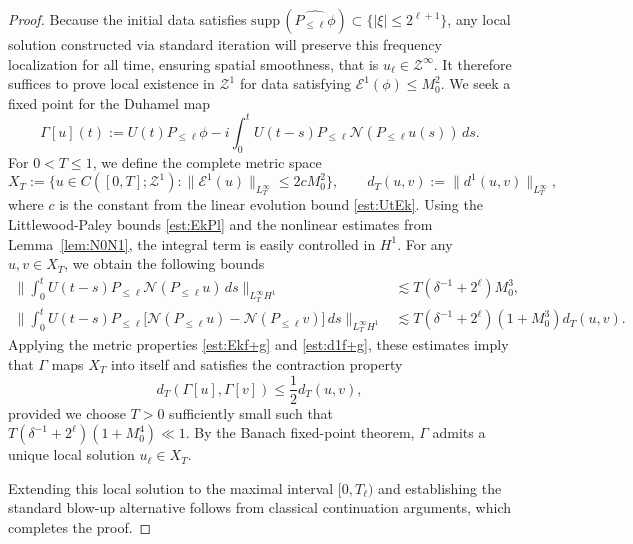 \documentclass{amsart}
\numberwithin{equation}{section}
\begin{document}
\begin{proof}
Because the initial data satisfies $\mathrm{supp}\,(\widehat{P_{\leq \ell}\phi}) \subset \{ |\xi| \leq 2^{\ell+1}\}$, any local solution constructed via standard iteration will preserve this frequency localization for all time, ensuring spatial smoothness, that is $u_\ell \in \mathcal{Z}^\infty$. It therefore suffices to prove local existence in $\mathcal{Z}^1$ for data satisfying $\mathcal{E}^1(\phi) \leq M_0^2$. We seek a fixed point for the Duhamel map
$$
    \Gamma[u](t) := U(t)P_{\leq \ell}\phi - i\int_0^t U(t-s)P_{\leq \ell}\mathcal{N}(P_{\leq \ell}u(s))\,ds. 
$$
For $0 < T \leq 1$, we define the complete metric space
$$ 
    X_T := \big\{ u \in C([0,T]; \mathcal{Z}^1) : \| \mathcal{E}^1(u)\|_{L^\infty_T} \leq 2c M_0^2 \big\}, \qquad d_T(u,v) := \| d^1(u,v)\|_{L^\infty_T},
$$
where $c$ is the constant from the linear evolution bound \eqref{est:UtEk}. Using the Littlewood-Paley bounds \eqref{est:EkPl} and the nonlinear estimates from Lemma~\ref{lem:N0N1}, the integral term is easily controlled in $H^1$. For any $u, v \in X_T$, we obtain the following bounds
\begin{align}
\Big\| \int_0^t U(t-s)P_{\leq \ell}\mathcal{N}(P_{\leq \ell}u)\,ds \Big\|_{L^\infty_T H^1} &\lesssim T(\delta^{-1} + 2^\ell)M_0^3, \label{est:LWPmoll1} \\
\Big\| \int_0^t U(t-s)P_{\leq \ell}\big[ \mathcal{N}(P_{\leq \ell}u) - \mathcal{N}(P_{\leq \ell}v) \big]\,ds \Big\|_{L^\infty_T H^1} &\lesssim T(\delta^{-1} + 2^\ell)(1 + M_0^3)d_T(u,v). \label{est:LWPmoll2}\end{align}
Applying the metric properties \eqref{est:Ekf+g} and \eqref{est:d1f+g}, these estimates imply that $\Gamma$ maps $X_T$ into itself and satisfies the contraction property
$$ 
    d_T(\Gamma[u], \Gamma[v]) \leq \frac{1}{2} d_T(u,v), 
$$
provided we choose $T > 0$ sufficiently small such that $T(\delta^{-1} + 2^\ell)(1 + M_0^4) \ll 1$. By the Banach fixed-point theorem, $\Gamma$ admits a unique local solution $u_\ell \in X_T$. 

Extending this local solution to the maximal interval $[0, T_\ell)$ and establishing the standard blow-up alternative follows from classical continuation arguments, which completes the proof.
\end{proof}



\end{document}
